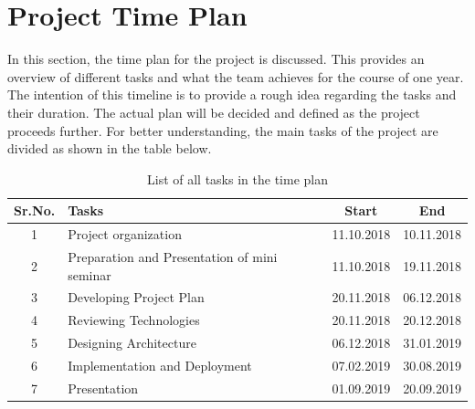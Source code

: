 \chapter{Project Time Plan}
\label{ch:Project Time Plan}

In this section, the time plan for the project is discussed. This provides an overview of different tasks and what the team achieves for the course of one year. The intention of this timeline is to provide a rough idea regarding the tasks and their duration. The actual plan will be decided and defined as the project proceeds further. For better understanding, the main tasks of the project are divided as shown in the table below.

\begin{table} [h]
\centering
	\begin{tabular}{|c|l|c|c|}
	\hline
		Sr.No. & Tasks & Start & End\\
		\hline
		1 &	Project organization & 11.10.2018 &	10.11.2018\\
		\hline
		2 &	Preparation and Presentation of mini seminar & 11.10.2018 &	19.11.2018\\
		\hline
		3 &	Developing Project Plan & 20.11.2018 & 06.12.2018\\
		\hline
		4 &	Reviewing Technologies & 20.11.2018 & 20.12.2018\\
		\hline
		5 &	Designing Architecture &	06.12.2018 & 31.01.2019\\
		\hline
		6 & Implementation and Deployment &	07.02.2019 & 30.08.2019\\
		\hline
		7 & Presentation &	01.09.2019 & 20.09.2019\\
		\hline
	\end{tabular}
\caption{List of all tasks in the time plan}
\end{table}

